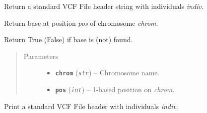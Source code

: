 \documentclass[letterpaper,10pt,english]{sphinxmanual}
\begin{document}
\begin{fulllineitems}
\begin{fulllineitems}
\label{vcf:libPoMo.vcf.VCFSeq.get_header_line_string}
Return a standard VCF File header string with individuals \emph{indiv}.

\end{fulllineitems}


\begin{fulllineitems}
\label{vcf:libPoMo.vcf.VCFSeq.get_nuc_base}
Return base at position \emph{pos} of chromosome \emph{chrom}.

\end{fulllineitems}


\begin{fulllineitems}
\label{vcf:libPoMo.vcf.VCFSeq.has_base}
Return True (False) if base is (not) found.
\begin{quote}\begin{description}
\item[{Parameters}] \leavevmode\begin{itemize}
\item {} 
\textbf{\texttt{chrom}} (\emph{\texttt{str}}) -- Chromosome name.

\item {} 
\textbf{\texttt{pos}} (\emph{\texttt{int}}) -- 1-based position on \emph{chrom}.

\end{itemize}

\end{description}\end{quote}

\end{fulllineitems}


\begin{fulllineitems}
\label{vcf:libPoMo.vcf.VCFSeq.print_header_line}
Print a standard VCF File header with individuals \emph{indiv}.

\end{fulllineitems}


\end{fulllineitems}
\end{document}
